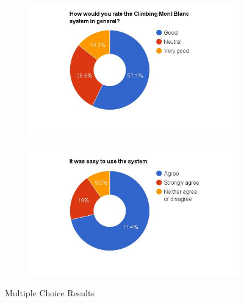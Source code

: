\begin{figure}
    \begin{subfigure}[h]{0.48\textwidth}
        \centerline{\includegraphics[width=1.5\textwidth]{results/general_cmb.jpg}}
        \caption{}
        \label{fig:cmb-general}
    \end{subfigure}
    \hfill
    \begin{subfigure}[h]{0.48\textwidth}
        \centerline{\includegraphics[width=1.5\textwidth]{results/easy_to_use.jpg}}
        \caption{}
        \label{fig:cmb-easy-use}
    \end{subfigure}
    \caption{Multiple Choice Results}
    \label{fig:multiplechoice}
\end{figure}


